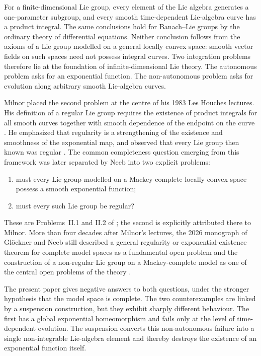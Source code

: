 \documentclass[11pt]{article}
\theoremstyle{remark}
\begin{document}
\label{sec:introduction}

For a finite-dimensional Lie group, every element of the Lie algebra generates
a one-parameter subgroup, and every smooth time-dependent Lie-algebra curve
has a product integral.  The same conclusions hold for Banach--Lie groups by
the ordinary theory of differential equations.  Neither conclusion follows
from the axioms of a Lie group modelled on a general locally convex space:
smooth vector fields on such spaces need not possess integral curves.  Two
integration problems therefore lie at the foundation of infinite-dimensional
Lie theory.  The autonomous problem asks for an exponential function.  The
non-autonomous problem asks for evolution along arbitrary smooth
Lie-algebra curves.

Milnor placed the second problem at the centre of his 1983 Les Houches
lectures.  His definition of a regular Lie group requires the existence of
product integrals for all smooth curves together with smooth dependence of
the endpoint on the curve
\cite[Definition~7.6, p.~1046]{Milnor1984}.  He emphasized that regularity is
a strengthening of the existence and smoothness of the exponential map, and
observed that every Lie group then known was regular
\cite[p.~1046]{Milnor1984}.  The common completeness question emerging from
this framework was later separated by Neeb into two explicit problems:

\begin{enumerate}[label=\textup{(\roman*)},leftmargin=2.2em]
\item must every Lie group modelled on a Mackey-complete locally convex space
      possess a smooth exponential function;
\item must every such Lie group be regular?
\end{enumerate}

These are Problems~II.1 and II.2 of \cite{Neeb2006}; the second is explicitly
attributed there to Milnor.  More than four decades after Milnor's lectures,
the 2026 monograph of Gl\"ockner and Neeb still described a general
regularity or exponential-existence theorem for complete model spaces as a
fundamental open problem and the construction of a non-regular Lie group on a
Mackey-complete model as one of the central open problems of the theory
\cite[Introduction, p.~9; discussion preceding Proposition~6.3.2,
p.~458]{GlocknerNeebBook2026}.

The present paper gives negative answers to both questions, under the stronger
hypothesis that the model space is complete.  The two counterexamples are
linked by a suspension construction, but they exhibit sharply different
behaviour.  The first has a global exponential homeomorphism and fails only at
the level of time-dependent evolution.  The suspension converts this
non-autonomous failure into a single non-integrable Lie-algebra element and
thereby destroys the existence of an exponential function itself.
\end{document}
